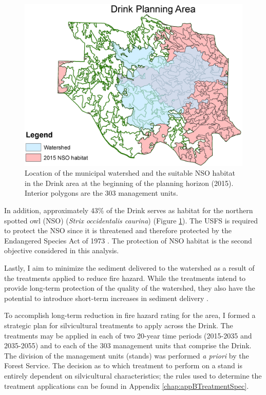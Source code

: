 \begin{figure}
\centering
\includegraphics[width=.5\textwidth]{../images/DrinkMap_NSOAndWatershed}
\caption[NSO Habitat and municipal watershed in the Drink Planning Area]{Location of the municipal watershed and the suitable NSO habitat in the Drink area at the beginning of the planning horizon (2015). Interior polygons are the 303 management units.}
\label{fig:drinkOwlAndWatershed}
\end{figure}

In addition, approximately 43\% of the Drink serves as habitat for the northern spotted owl (NSO) (\textit{Strix occidentalis caurina}) (Figure \ref{fig:drinkOwlAndWatershed}). The USFS is required to protect the NSO since it is threatened and therefore protected by the Endangered Species Act of 1973 \cite{congress1973endangered}. The protection of NSO habitat is the second objective considered in this analysis.

Lastly, I aim to minimize the sediment delivered to the watershed as a result of the treatments applied to reduce fire hazard. While the treatments intend to provide long-term protection of the quality of the watershed, they also have the potential to introduce short-term increases in sediment delivery \cite{o2005conceptual}.

To accomplish long-term reduction in fire hazard rating for the area, I formed a strategic plan for silvicultural treatments to apply across the Drink. The treatments may be applied in each of two 20-year time periods (2015-2035 and 2035-2055) and to each of the 303 management units that comprise the Drink. The division of the management units (stands) was performed \textit{a priori} by the Forest Service. The decision as to which treatment to perform on a stand is entirely dependent on silvicultural characteristics; the rules used to determine the treatment applications can be found in Appendix \ref{chap:appBTreatmentSpec}.


